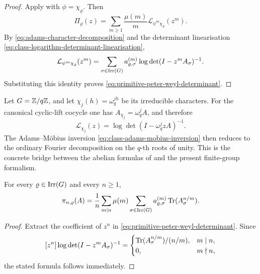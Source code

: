 \begin{proof}
  Apply  with
  \(\phi=\chi_\varrho\). Then
  \[
    \Pi_\varrho(z)
    =
    \sum_{m\ge 1}\frac{\mu(m)}{m}
      \mathcal L_{\psi^m\chi_\varrho}(z^m).
  \]
  By \eqref{eq:adams-character-decomposition} and the determinant
  linearisation \eqref{eq:class-logarithm-determinant-linearisation},
  \[
    \mathcal L_{\psi^m\chi_\varrho}(z^m)
    =
    \sum_{\sigma\in\operatorname{Irr}(G)}
      a_{\varrho,\sigma}^{(m)}
      \log\det(I-z^mA_\sigma)^{-1}.
  \]
  Substituting this identity proves
  \eqref{eq:primitive-peter-weyl-determinant}.
\end{proof}

\begin{remark}
  \label{rem:abelian-toy-model-cyclic}
  Let \(G=\mathbb{Z}/q\mathbb{Z}\), and let \(\chi_j(h)=\omega_q^{jh}\) be its
  irreducible characters. For the canonical cyclic-lift cocycle one has
  \(A_{\chi_j}=\omega_q^jA\), and therefore
  \[
    \mathcal L_{\chi_j}(z)=\log\det(I-\omega_q^j zA)^{-1}.
  \]
  The Adams--M\"obius inversion
  \eqref{eq:class-adams-mobius-inversion} then reduces to the ordinary
  Fourier decomposition on the \(q\)-th roots of unity. This is the
  concrete bridge between the abelian formulas of
   and the present finite-group formalism.
\end{remark}

\begin{corollary}
  \label{cor:primitive-peter-weyl-trace}
  For every \(\varrho\in\operatorname{Irr}(G)\) and every \(n\ge 1\),
  \begin{equation}\label{eq:primitive-peter-weyl-trace}
    \pi_{n,\varrho}(A)
    =
    \frac{1}{n}\sum_{m\mid n}\mu(m)
      \sum_{\sigma\in\operatorname{Irr}(G)}
        a_{\varrho,\sigma}^{(m)}
        \operatorname{Tr}(A_\sigma^{n/m}).
  \end{equation}
\end{corollary}

\begin{proof}
  Extract the coefficient of \(z^n\) in
  \eqref{eq:primitive-peter-weyl-determinant}. Since
  \[
    [z^n]\log\det(I-z^mA_\sigma)^{-1}
    =
    \begin{cases}
      \operatorname{Tr}(A_\sigma^{n/m})/(n/m), & m\mid n, \\
      0, & m\nmid n,
    \end{cases}
  \]
  the stated formula follows immediately.
\end{proof}

